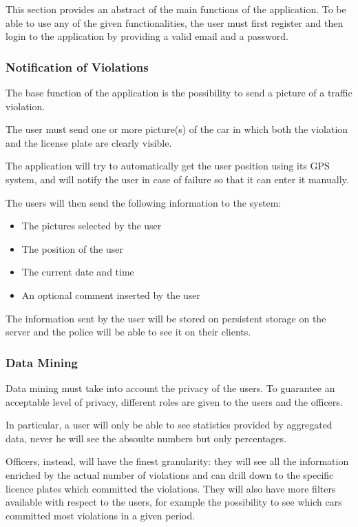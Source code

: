 This section provides an abstract of the main functions of the application. To be able to use any of the given functionalities, the user must first register and then login to the application by providing a valid email and a password.
\subsubsection{Notification of Violations}
The base function of the application is the possibility to send a picture of a traffic violation.

The user must send one or more picture(s) of the car in which both the violation and the license plate are clearly visible.

The application will try to automatically get the user position using its GPS system, and will notify the user in case of failure so that it can enter it manually.

The users will then send the following information to the system:
\begin{itemize}
    \item The pictures selected by the user
    \item The position of the user
    \item The current date and time
    \item An optional comment inserted by the user
\end{itemize}
The information sent by the user will be stored on persistent storage on the server and the police will be able to see it on their clients.

\subsubsection{Data Mining}
Data mining must take into account the privacy of the users.
To guarantee an acceptable level of privacy, different roles are given to the users and the officers.

In particular, a user will only be able to see statistics provided by aggregated data, never he will see the absoulte numbers but only percentages. 

Officers, instead, will have the finest granularity: they will see all the information enriched by the actual number of violations and can drill down to the specific licence plates which committed the violations.
They will also have more filters available with respect to the users, for example the possibility to see which cars committed most violations in a given period.